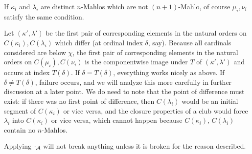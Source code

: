 \documentclass{slides}
\begin{document}
\begin{slide}

If $\kappa_i$ and $\lambda_i$ are distinct $n$-Mahlos which are not $(n+1)$-Mahlo, of course $\mu_i,\nu_i$ satisfy the same condition.

 Let $(\kappa',\lambda')$ be the first pair of corresponding elements in the natural orders on $C(\kappa_i),C(\lambda_i)$ which differ (at ordinal index $\delta$, say).  Because all cardinals considered are below $\chi$, the first pair of corresponding elements in the natural orders on $C(\mu_i),C(\nu_i)$ is the componentwise image under
$T$ of $(\kappa',\lambda')$  and occurs at index $T(\delta)$.  If $\delta=T(\delta)$, everything works nicely as above.  If $\delta \neq T(\delta)$, failure occurs, and we will analyze this more carefully in further discussion at a later point.  We do need to note that the point of difference must exist:  if there was no first point of difference,
then $C(\lambda_i)$ would be an initial segment of $C(\kappa_i)$ or vice versa, and the closure properties of a club would force $\lambda_i$ into $C(\kappa_i)$ or
vice versa, which cannot happen because $C(\kappa_i)$, $C(\lambda_i)$ contain no $n$-Mahlos.

Applying $\cdot_{\cal A}$ will not break anything unless it is broken for the reason described.


\end{slide}
\end{document}
